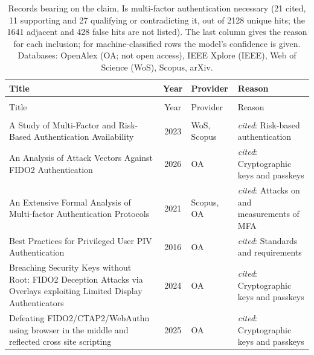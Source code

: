 
\begingroup\footnotesize
\begin{longtable}{@{}%
  >{\raggedright\arraybackslash}p{}c%
  >{\raggedright\arraybackslash}p{}%
  >{\raggedright\arraybackslash}p{}@{}}
\caption{Records bearing on the claim, Is multi-factor authentication necessary (21 cited, 11 supporting and 27 qualifying or contradicting it, out of 2128 unique hits; the 1641 adjacent and 428 false hits are not listed). The last column gives the reason for each inclusion; for machine-classified rows the model's confidence is given. Databases: OpenAlex (OA; not open access), IEEE Xplore (IEEE), Web of Science (WoS), Scopus, arXiv.}\label{tab:hits-necessary}\\
\toprule
Title & Year & Provider & Reason \\
\midrule
\endfirsthead
\multicolumn{4}{@{}l}{\emph{\tablename~\thetable{} (cont.)}}\\
\toprule
Title & Year & Provider & Reason \\
\midrule
\endhead
\midrule \multicolumn{4}{r@{}}{\emph{continued on next page}}\\
\endfoot
\bottomrule
\endlastfoot
A Study of Multi-Factor and Risk-Based Authentication Availability & 2023 & WoS, Scopus & \emph{cited}: Risk-based authentication \\
An Analysis of Attack Vectors Against FIDO2 Authentication & 2026 & OA & \emph{cited}: Cryptographic keys and passkeys \\
An Extensive Formal Analysis of Multi-factor Authentication Protocols & 2021 & Scopus, OA & \emph{cited}: Attacks on and measurements of MFA \\
Best Practices for Privileged User PIV Authentication & 2016 & OA & \emph{cited}: Standards and requirements \\
Breaching Security Keys without Root: FIDO2 Deception Attacks via Overlays exploiting Limited Display Authenticators & 2024 & OA & \emph{cited}: Cryptographic keys and passkeys \\
Defeating FIDO2/CTAP2/WebAuthn using browser in the middle and reflected cross site scripting & 2025 & OA & \emph{cited}: Cryptographic keys and passkeys \\

\end{longtable}
